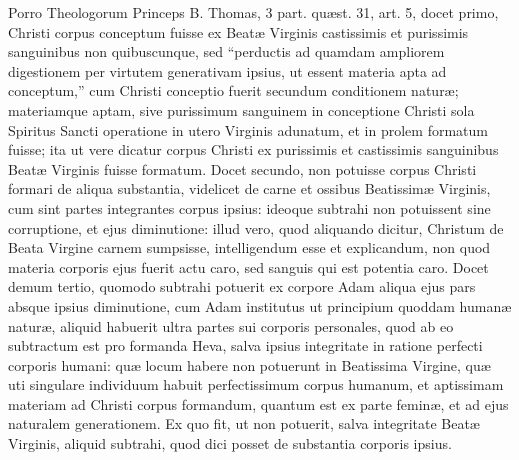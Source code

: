 Porro Theologorum Princeps B. Thomas, 3 part. quæst. 31, art. 5,
docet primo, Christi corpus conceptum fuisse ex Beatæ Virginis
castissimis et purissimis sanguinibus non quibuscunque, sed ``perductis
ad quamdam ampliorem digestionem per virtutem generativam ipsius, ut
essent materia apta ad conceptum,'' cum Christi conceptio fuerit
secundum conditionem naturæ; materiamque aptam, sive purissimum
sanguinem in conceptione Christi sola Spiritus Sancti operatione in
utero Virginis adunatum, et in prolem formatum fuisse; ita ut vere
dicatur corpus Christi ex purissimis et castissimis sanguinibus Beatæ
Virginis fuisse formatum. Docet secundo, non potuisse corpus Christi
formari de aliqua substantia, videlicet de carne et ossibus Beatissimæ
Virginis, cum sint partes integrantes corpus ipsius: ideoque subtrahi
non potuissent sine corruptione, et ejus diminutione: illud vero, quod
aliquando dicitur, Christum de Beata Virgine carnem sumpsisse,
intelligendum esse et explicandum, non quod materia corporis ejus fuerit
actu caro, sed sanguis qui est potentia caro. Docet demum tertio,
quomodo subtrahi potuerit ex corpore Adam aliqua ejus pars absque ipsius
diminutione, cum Adam institutus ut principium quoddam humanæ naturæ,
aliquid habuerit ultra partes sui corporis personales, quod ab eo
subtractum est pro formanda Heva, salva ipsius integritate in ratione
perfecti corporis humani: quæ locum habere non potuerunt in Beatissima
Virgine, quæ uti singulare individuum habuit perfectissimum corpus
humanum, et aptissimam materiam ad Christi corpus formandum, quantum est
ex parte feminæ, et ad ejus naturalem generationem. Ex quo fit,
ut non potuerit, salva integritate Beatæ Virginis, aliquid subtrahi,
quod dici posset de substantia corporis ipsius.


